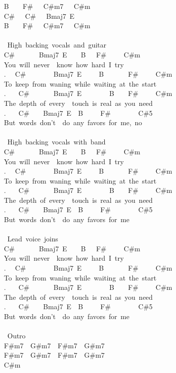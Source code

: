 {B\ \ \ \ F\#\ \ \ C\#m7\ \ \ C\#m\\
C\#\ \ \ C\#\ \ \ Bmaj7\ E\\
B\ \ \ \ F\#\ \ \ C\#m7\ \ \ C\#m\\
\\
\lbrack\ High\ backing\ vocals\ and\ guitar\rbrack\\
C\#\ \ \ \ \ \ \ Bmaj7\ E\ \ \ \ B\ \ \ F\#\ \ \ \ \ C\#m\\
You\ will\ never\ \ know\ how\ hard\ I\ try\\
. \ \ C\#\ \ \ \ \ \ \ \ Bmaj7\ E\ \ \ \ \ B\ \ \ \ \ \ \ F\#\ \ \ \ \ C\#m\\
To\ keep\ from\ waning\ while\ waiting\ at\ the\ start\\
. \ \ \ C\#\ \ \ \ \ \ \ Bmaj7\ E\ \ \ \ \ \ \ \ B\ \ \ \ F\#\ \ \ \ \ C\#m\\
The\ depth\ of\ every\ \ touch\ is\ real\ as\ you\ need\\
. \ \ \ C\#\ \ \ \ Bmaj7\ E\ \ B\ \ \ \ \ F\#\ \ \ \ \ \ \ \ C\#5\\
But\ words\ don't\ \ do\ any\ favors\ for\ me,\ no\\
\\
\lbrack\ High\ backing\ vocals\ with\ band\rbrack\\
C\#\ \ \ \ \ \ \ Bmaj7\ E\ \ \ \ B\ \ \ F\#\ \ \ \ \ C\#m\\
You\ will\ never\ \ know\ how\ hard\ I\ try\\
. \ \ C\#\ \ \ \ \ \ \ \ Bmaj7\ E\ \ \ \ \ B\ \ \ \ \ \ \ F\#\ \ \ \ \ C\#m\\
To\ keep\ from\ waning\ while\ waiting\ at\ the\ start\\
. \ \ \ C\#\ \ \ \ \ \ \ Bmaj7\ E\ \ \ \ \ \ \ \ B\ \ \ \ F\#\ \ \ \ \ C\#m\\
The\ depth\ of\ every\ \ touch\ is\ real\ as\ you\ need\\
. \ \ \ C\#\ \ \ \ Bmaj7\ E\ \ B\ \ \ \ \ F\#\ \ \ \ \ \ \ \ C\#5\\
But\ words\ don't\ \ do\ any\ favors\ for\ me\\
\\
\lbrack\ Lead\ voice\ joins\rbrack\\
C\#\ \ \ \ \ \ \ Bmaj7\ E\ \ \ \ B\ \ \ F\#\ \ \ \ \ C\#m\\
You\ will\ never\ \ know\ how\ hard\ I\ try\\
. \ \ C\#\ \ \ \ \ \ \ \ Bmaj7\ E\ \ \ \ \ B\ \ \ \ \ \ \ F\#\ \ \ \ \ C\#m\\
To\ keep\ from\ waning\ while\ waiting\ at\ the\ start\\
. \ \ \ C\#\ \ \ \ \ \ \ Bmaj7\ E\ \ \ \ \ \ \ \ B\ \ \ \ F\#\ \ \ \ \ C\#m\\
The\ depth\ of\ every\ \ touch\ is\ real\ as\ you\ need\\
. \ \ \ C\#\ \ \ \ Bmaj7\ E\ \ B\ \ \ \ \ F\#\ \ \ \ \ \ \ \ C\#5\\
But\ words\ don't\ \ do\ any\ favors\ for\ me\\
\\
\lbrack\ Outro\rbrack\\
F\#m7\ \ G\#m7\ \ F\#m7\ \ G\#m7\\
F\#m7\ \ G\#m7\ \ F\#m7\ \ G\#m7\\
C\#m\ }
